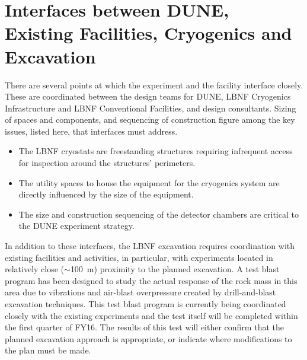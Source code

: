 \section{Interfaces between DUNE, Existing Facilities, Cryogenics and Excavation}
\label{sec:fscf-excav-interfaces}

There are several points at which the experiment and the facility interface closely. These are coordinated between the design teams for DUNE, LBNF Cryogenics Infrastructure and LBNF Conventional Facilities, and design consultants. Sizing of spaces and components, and sequencing of construction figure among the key issues, listed here, that interfaces must address.
\begin{itemize}
\item The LBNF cryostats are freestanding structures requiring infrequent 
access for inspection around the structures' perimeters. %
\item The utility spaces to house the equipment for the cryogenics system are directly influenced by the size of the equipment.
\item The size and construction sequencing of the detector chambers are critical to the DUNE experiment strategy.
\end{itemize}

In addition to these interfaces, the LBNF excavation requires coordination with existing facilities and activities, in particular, with experiments located in relatively close ($\sim$100~m) proximity to the planned excavation.  %
A test blast program has been designed to study the actual response of the rock mass in this area due to vibrations and air-blast overpressure created by drill-and-blast excavation techniques.  This test blast program is currently being coordinated closely with the existing experiments %
and the %
test itself %
will be completed within the first quarter of FY16.  The results of this test will %
either confirm that the planned excavation approach is appropriate, or indicate where %
modifications to the plan must be made. %





